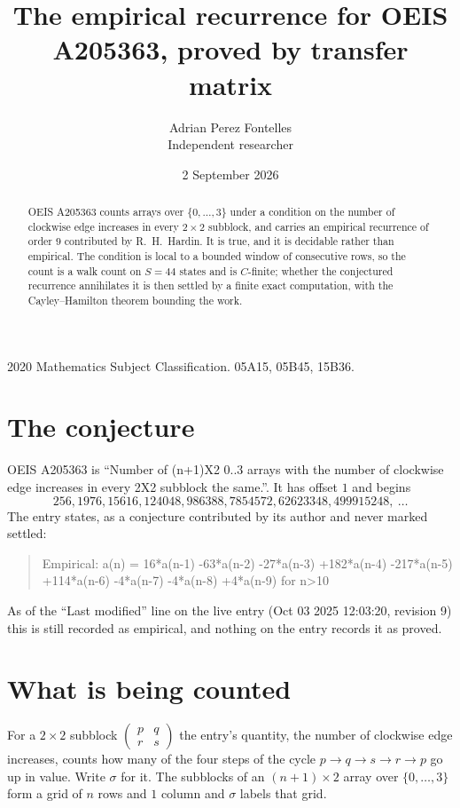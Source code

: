 \documentclass[11pt,a4paper]{article}
\title{The empirical recurrence for OEIS A205363, proved by transfer matrix}
\author{Adrian Perez Fontelles\\ \small Independent researcher}
\date{2 September 2026}
\theoremstyle{plain}
\theoremstyle{definition}
\begin{document}
\maketitle

\begin{abstract}
OEIS A205363 counts arrays over $\{0,\dots,3\}$ under a condition on the number of clockwise edge increases
in every $2\times2$ subblock, and carries an empirical recurrence of order $9$ contributed by
R.~H.~Hardin. It is true, and it is decidable rather than empirical. The condition is local to
a bounded window of consecutive rows, so the count is a walk count on $S=44$ states and is
$C$-finite; whether the conjectured recurrence annihilates it is then settled by a finite exact
computation, with the Cayley--Hamilton theorem bounding the work.
\end{abstract}

\noindent\small 2020 Mathematics Subject Classification. 05A15, 05B45, 15B36.\normalsize

\section{The conjecture}

OEIS A205363 is ``Number of (n+1)X2 0..3 arrays with the number of clockwise edge increases in every 2X2 subblock the same.''. It has offset $1$ and begins
\[
256, 1976, 15616, 124048, 986388, 7854572, 62623348, 499915248,\ \dots
\]
The entry states, as a conjecture contributed by its author and never marked settled:
\begin{quote}
Empirical: a(n) = 16*a(n-1) -63*a(n-2) -27*a(n-3) +182*a(n-4) -217*a(n-5) +114*a(n-6) -4*a(n-7) -4*a(n-8) +4*a(n-9) for n>10
\end{quote}
As of the ``Last modified'' line on the live entry (Oct 03 2025 12:03:20, revision 9) this is still
recorded as empirical, and nothing on the entry records it as proved.

\section{What is being counted}

For a $2\times2$ subblock $\begin{pmatrix}p&q\\r&s\end{pmatrix}$ the
entry's quantity, the number of clockwise edge increases, counts how many of the four steps of the cycle $p\to q\to s\to r\to p$ go up in value. Write $\sigma$ for it. The subblocks of an
$(n+1)\times2$ array over $\{0,\dots,3\}$ form a grid of $n$ rows and $1$
column and $\sigma$ labels that grid.
\end{document}
